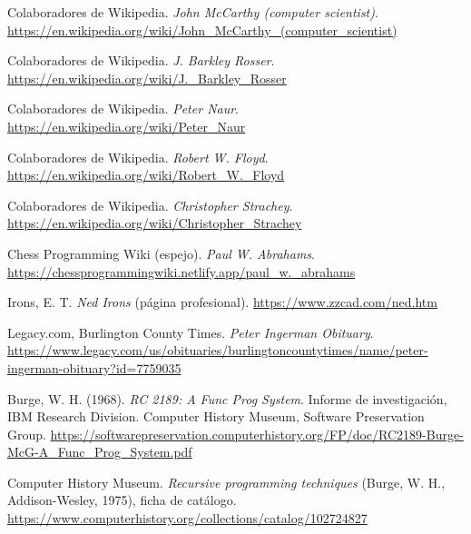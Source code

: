 \documentclass[11pt,twoside,openany]{report}
\begin{document}
\begin{enumerate}[label={[\arabic*]}, ref={\arabic*}, leftmargin=2.2em, itemsep=0pt, topsep=0pt, parsep=0pt]
  \item\label{ref:mccarthy} Colaboradores de Wikipedia. \emph{John McCarthy (computer scientist)}. \url{https://en.wikipedia.org/wiki/John_McCarthy_(computer_scientist)}
  \item\label{ref:rosser} Colaboradores de Wikipedia. \emph{J. Barkley Rosser}. \url{https://en.wikipedia.org/wiki/J._Barkley_Rosser}
  \item\label{ref:naur} Colaboradores de Wikipedia. \emph{Peter Naur}. \url{https://en.wikipedia.org/wiki/Peter_Naur}
  \item\label{ref:floyd} Colaboradores de Wikipedia. \emph{Robert W. Floyd}. \url{https://en.wikipedia.org/wiki/Robert_W._Floyd}
  \item\label{ref:strachey} Colaboradores de Wikipedia. \emph{Christopher Strachey}. \url{https://en.wikipedia.org/wiki/Christopher_Strachey}
  \item\label{ref:abrahams} Chess Programming Wiki (espejo). \emph{Paul W. Abrahams}. \url{https://chessprogrammingwiki.netlify.app/paul_w._abrahams}
  \item\label{ref:irons} Irons, E. T. \emph{Ned Irons} (página profesional). \url{https://www.zzcad.com/ned.htm}
  \item\label{ref:ingerman} Legacy.com, Burlington County Times. \emph{Peter Ingerman Obituary}. \url{https://www.legacy.com/us/obituaries/burlingtoncountytimes/name/peter-ingerman-obituary?id=7759035}
  \item\label{ref:burgeibm} Burge, W. H. (1968). \emph{RC 2189: A Func Prog System}. Informe de investigación, IBM Research Division. Computer History Museum, Software Preservation Group. \url{https://softwarepreservation.computerhistory.org/FP/doc/RC2189-Burge-McG-A_Func_Prog_System.pdf}
  \item\label{ref:burgelibro} Computer History Museum. \emph{Recursive programming techniques} (Burge, W. H., Addison-Wesley, 1975), ficha de catálogo. \url{https://www.computerhistory.org/collections/catalog/102724827}
\end{enumerate}
\end{document}
